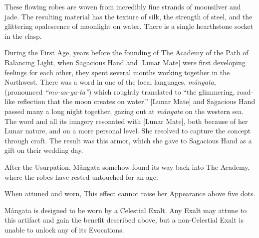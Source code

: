 ﻿


These flowing robes are woven from incredibly fine strands of moonsilver and
jade. The resulting material has the texture of silk, the strength of steel,
and the glittering opalescence of moonlight on water. There is a single
hearthstone socket in the clasp.

During the First Age, years before the founding of The Academy of the Path of
Balancing Light, when Sagacious Hand and [Lunar Mate] were first developing
feelings for each other, they spent several months working together in the
Northwest. There was a word in one of the local languages, \textit{mångata},
(pronounced \textit{``mo-an-ga-ta''}) which roughtly translated to ``the
glimmering, road-like reflection that the moon creates on water.'' [Lunar Mate]
and Sagacious Hand passed many a long night together, gazing out at
\textit{mångata} on the western sea. The word and all its imagery resonated
with [Lunar Mate], both because of her Lunar nature, and on a more personal
level. She resolved to capture the concept through craft. The result was this
armor, which she gave to Sagacious Hand as a gift on their wedding day.

After the Usurpation, Mångata somehow found its way back into The Academy,
where the robes have rested untouched for an age.


When attuned and worn,  This effect cannot raise her Appearance above
five dots.

Mångata is designed to be worn by a Celestial Exalt. Any Exalt may attune to
this artifact and gain the benefit described above, but a non-Celestial Exalt
is unable to unlock any of its Evocations.

% 

